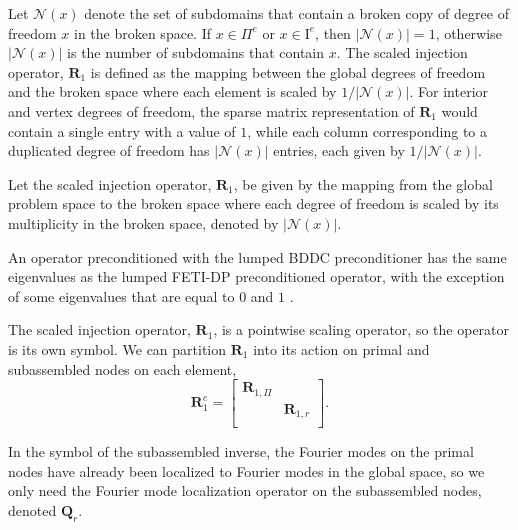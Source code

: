 \documentclass[review]{siamart190516}
\begin{document}
Let $\mathcal{N} \left( x \right)$ denote the set of subdomains that contain a broken copy of degree of freedom $x$ in the broken space.
If $x \in \Pi^e$ or $x \in \text{I}^e$, then $\lvert \mathcal{N} \left( x \right) \rvert = 1$, otherwise $\lvert \mathcal{N} \left( x \right) \rvert$ is the number of subdomains that contain $x$.
The scaled injection operator, $\mathbf{R}_1$ is defined as the mapping between the global degrees of freedom and the broken space where each element is scaled by $1 / \lvert \mathcal{N} \left( x \right) \rvert$.
For interior and vertex degrees of freedom, the sparse matrix representation of $\mathbf{R}_1$ would contain a single entry with a value of $1$, while each column corresponding to a duplicated degree of freedom has $\lvert \mathcal{N} \left( x \right) \rvert$ entries, each given by $1 / \lvert \mathcal{N} \left( x \right) \rvert$.

\begin{definition}
Let the scaled injection operator, $\mathbf{R}_1$, be given by the mapping from the global problem space to the broken space where each degree of freedom is scaled by its multiplicity in the broken space, denoted by $\lvert \mathcal{N} \left( x \right) \rvert$.
\label{def:scaledinjection}
\end{definition}

An operator preconditioned with the lumped BDDC preconditioner has the same eigenvalues as the lumped FETI-DP preconditioned operator, with the exception of some eigenvalues that are equal to $0$ and $1$ \cite{li2007use}.

The scaled injection operator, $\mathbf{R}_1$, is a pointwise scaling operator, so the operator is its own symbol.
We can partition $\mathbf{R}_1$ into its action on primal and subassembled nodes on each element,
\begin{equation}
\mathbf{R}_1^e =
\begin{bmatrix}
\mathbf{R}_{1, \Pi} &                    \\
                    & \mathbf{R}_{1, r}  \\
\end{bmatrix}.
\end{equation}

In the symbol of the subassembled inverse, the Fourier modes on the primal nodes have already been localized to Fourier modes in the global space, so we only need the Fourier mode localization operator on the subassembled nodes, denoted $\mathbf{Q}_r$.
\end{document}
